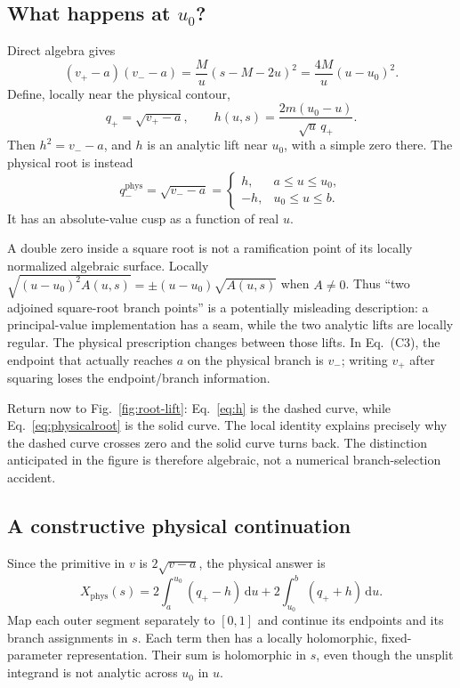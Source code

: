 \documentclass[11pt,a4paper]{article}
\newcommand{\dd}{\,\mathrm d}
\newcommand{\phys}{\mathrm{phys}}
\begin{document}
\subsection{What happens at \texorpdfstring{$u_0$}{u0}?}
Direct algebra gives
\begin{equation}
 (v_+-a)(v_--a)=\frac{M}{u}(s-M-2u)^2
 =\frac{4M}{u}(u-u_0)^2.
 \label{eq:identity}
\end{equation}
Define, locally near the physical contour,
\begin{equation}
 q_+=\sqrt{v_+-a},\qquad
 h(u,s)=\frac{2m(u_0-u)}{\sqrt u\,q_+}.
 \label{eq:h}
\end{equation}
Then $h^2=v_--a$, and $h$ is an analytic lift near $u_0$, with a simple zero there. The physical root is instead
\begin{equation}
 q_-^{\phys}=\sqrt{v_--a}=
 \begin{cases}h,&a\leq u\leq u_0,\\-h,&u_0\leq u\leq b.\end{cases}
 \label{eq:physicalroot}
\end{equation}
It has an absolute-value cusp as a function of real $u$.

A double zero inside a square root is not a ramification point of its locally normalized algebraic surface. Locally $\sqrt{(u-u_0)^2A(u,s)}=\pm(u-u_0)\sqrt{A(u,s)}$ when $A\ne0$. Thus ``two adjoined square-root branch points'' is a potentially misleading description: a principal-value implementation has a seam, while the two analytic lifts are locally regular. The physical prescription changes between those lifts. In Eq.~(C3), the endpoint that actually reaches $a$ on the physical branch is $v_-$; writing $v_+$ after squaring loses the endpoint/branch information.

Return now to Fig.~\ref{fig:root-lift}: Eq.~\eqref{eq:h} is the dashed curve, while Eq.~\eqref{eq:physicalroot} is the solid curve. The local identity explains precisely why the dashed curve crosses zero and the solid curve turns back. The distinction anticipated in the figure is therefore algebraic, not a numerical branch-selection accident.

\subsection{A constructive physical continuation}
Since the primitive in $v$ is $2\sqrt{v-a}$, the physical answer is
\begin{equation}
 \boxed{X_{\phys}(s)=2\int_a^{u_0}(q_+-h)\dd u
                 +2\int_{u_0}^{b}(q_++h)\dd u.}
 \label{eq:split}
\end{equation}
Map each outer segment separately to $[0,1]$ and continue its endpoints and its branch assignments in $s$. Each term then has a locally holomorphic, fixed-parameter representation. Their sum is holomorphic in $s$, even though the unsplit integrand is not analytic across $u_0$ in $u$.
\end{document}

